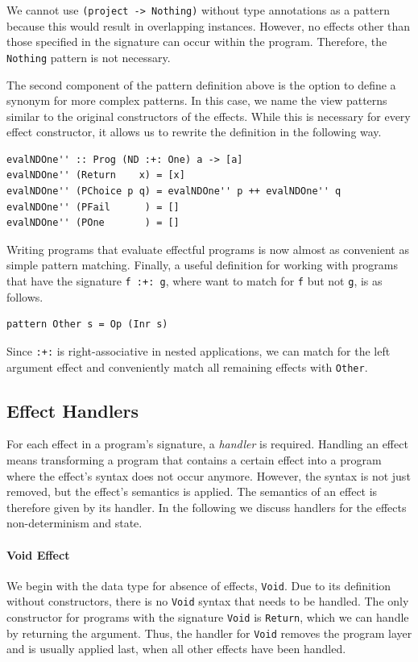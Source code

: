 \documentclass[a4paper, 11pt, fleqn, twoside]{scrreprt}
\newcommand{\hinl}[1]{\texttt{#1}}
\begin{document}
We cannot use \hinl{(project -> Nothing)} without type annotations as a pattern because this would result in overlapping instances.
However, no effects other than those specified in the signature can occur within the program.
Therefore, the \hinl{Nothing} pattern is not necessary.

The second component of the pattern definition above is the option to define a synonym for more complex patterns.
In this case, we name the view patterns similar to the original constructors of the effects.
While this is necessary for every effect constructor, it allows us to rewrite the definition in the following way.

\begin{verbatim}
evalNDOne'' :: Prog (ND :+: One) a -> [a]
evalNDOne'' (Return    x) = [x]
evalNDOne'' (PChoice p q) = evalNDOne'' p ++ evalNDOne'' q
evalNDOne'' (PFail      ) = []
evalNDOne'' (POne       ) = []
\end{verbatim}

Writing programs that evaluate effectful programs is now almost as convenient as simple pattern matching.
Finally, a useful definition for working with programs that have the signature \hinl{f :+: g}, where want to match for \hinl{f} but not \hinl{g}, is as follows.

\begin{verbatim}
pattern Other s = Op (Inr s)
\end{verbatim}

Since \hinl{:+:} is right-associative in nested applications, we can match for the left argument effect and conveniently match all remaining effects with \hinl{Other}.


\subsection{Effect Handlers}
\label{subsec:effectHandlers}
For each effect in a program's signature, a \textit{handler} is required.
Handling an effect means transforming a program that contains a certain effect into a program where the effect's syntax does not occur anymore.
However, the syntax is not just removed, but the effect's semantics is applied.
The semantics of an effect is therefore given by its handler.
In the following we discuss handlers for the effects non-determinism and state.

\paragraph{Void Effect}
We begin with the data type for absence of effects, \hinl{Void}.
Due to its definition without constructors, there is no \hinl{Void} syntax that needs to be handled.
The only constructor for programs with the signature \hinl{Void} is \hinl{Return}, which we can handle by returning the argument.
Thus, the handler for \hinl{Void} removes the program layer and is usually applied last, when all other effects have been handled.
\end{document}
